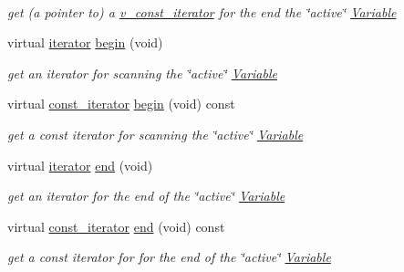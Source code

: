 \begin{DoxyCompactItemize}
$$\begin{DoxyCompactList}\small\item\em get (a pointer to) a \mbox{\hyperlink{class_s_m_spp__di__unipi__it_1_1_thin_var_dep_interface_1_1v__const__iterator}{v\+\_\+const\+\_\+iterator}} for the end the \char`\"{}active\char`\"{} \mbox{\hyperlink{class_s_m_spp__di__unipi__it_1_1_variable}{Variable}} \end{DoxyCompactList}\item 
virtual \mbox{\hyperlink{class_s_m_spp__di__unipi__it_1_1_thin_var_dep_interface_1_1iterator}{iterator}} \mbox{\hyperlink{group___thin_var_dep_interface___c_l_a_s_s_e_s_ga79162df6cbf36b4997db545dc30969e2}{begin}} (void)
\begin{DoxyCompactList}\small\item\em get an iterator for scanning the \char`\"{}active\char`\"{} \mbox{\hyperlink{class_s_m_spp__di__unipi__it_1_1_variable}{Variable}} \end{DoxyCompactList}\item 
virtual \mbox{\hyperlink{class_s_m_spp__di__unipi__it_1_1_thin_var_dep_interface_1_1const__iterator}{const\+\_\+iterator}} \mbox{\hyperlink{group___thin_var_dep_interface___c_l_a_s_s_e_s_ga4780b8a1692a5b1b810ace218aec9c63}{begin}} (void) const
\begin{DoxyCompactList}\small\item\em get a const iterator for scanning the \char`\"{}active\char`\"{} \mbox{\hyperlink{class_s_m_spp__di__unipi__it_1_1_variable}{Variable}} \end{DoxyCompactList}\item 
virtual \mbox{\hyperlink{class_s_m_spp__di__unipi__it_1_1_thin_var_dep_interface_1_1iterator}{iterator}} \mbox{\hyperlink{group___thin_var_dep_interface___c_l_a_s_s_e_s_gae1175d5cbc6627e3e49ed9bcb58ffce9}{end}} (void)
\begin{DoxyCompactList}\small\item\em get an iterator for the end of the \char`\"{}active\char`\"{} \mbox{\hyperlink{class_s_m_spp__di__unipi__it_1_1_variable}{Variable}} \end{DoxyCompactList}\item 
virtual \mbox{\hyperlink{class_s_m_spp__di__unipi__it_1_1_thin_var_dep_interface_1_1const__iterator}{const\+\_\+iterator}} \mbox{\hyperlink{group___thin_var_dep_interface___c_l_a_s_s_e_s_gabd4acdc34e7627e7740feff502da77e1}{end}} (void) const
\begin{DoxyCompactList}\small\item\em get a const iterator for for the end of the \char`\"{}active\char`\"{} \mbox{\hyperlink{class_s_m_spp__di__unipi__it_1_1_variable}{Variable}} \end{DoxyCompactList}\end{DoxyCompactItemize}
